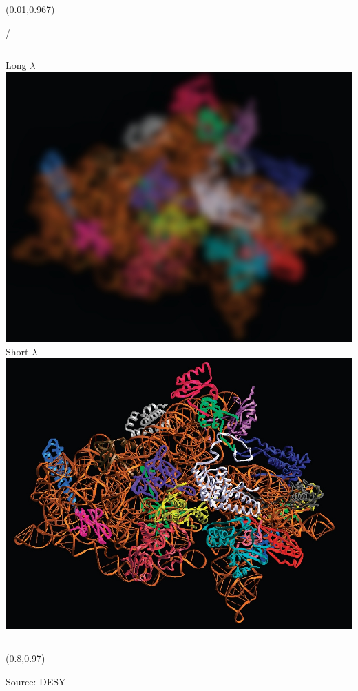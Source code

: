 \documentclass{beamer}
\makeatletter
\newcommand{\framenumber}{
\begin{textblock}{0}(0.01,0.967)
\begin{scriptsize}
{\color{gray}\insertframenumber/\inserttotalframenumber}
\end{scriptsize}
\end{textblock}
}
\makeatother
\begin{document}
\begin{frame}{}\framenumber
\begin{columns}[t]
    Long $\lambda$\\
    \includegraphics[width=\textwidth]{figures/appendix/macromol_long}
    Short $\lambda$\\
    \includegraphics[width=\textwidth]{figures/appendix/macromol_short}
\end{columns}
\begin{textblock}{0.15}(0.8,0.97)
\begin{tiny}Source: DESY\end{tiny}
\end{textblock}
\end{frame}
\end{document}
